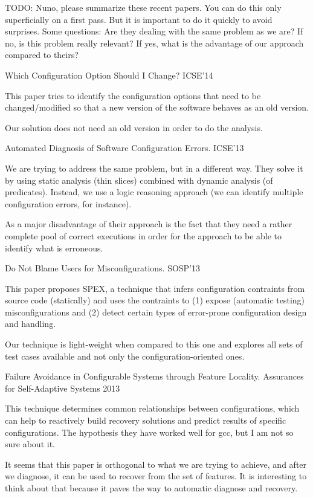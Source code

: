 TODO: Nuno, please summarize these recent papers.  You can do this
only superficially on a first pass.  But it is important to do it
quickly to avoid surprises.  Some questions: Are they dealing with the
same problem as we are?  If no, is this problem really relevant?  If
yes, what is the advantage of our approach compared to theirs?

Which Configuration Option Should I Change?  ICSE'14

This paper tries to identify the configuration options that need to be changed/modified
so that a new version of the software behaves as an old version.

Our solution does not need an old version in order to do the analysis.

Automated Diagnosis of Software Configuration Errors.  ICSE'13

We are trying to address the same problem, but in a different way. They solve it by using
static analysis (thin slices) combined with dynamic analysis (of predicates). Instead, we
use a logic reasoning approach (we can identify multiple configuration errors, for instance).

As a major disadvantage of their approach is the fact that they need a rather complete pool
of correct executions in order for the approach to be able to identify what is erroneous.


Do Not Blame Users for Misconfigurations.  SOSP'13

This paper proposes SPEX, a technique that infers configuration contraints from source
code (statically) and uses the contraints to (1) expose (automatic testing) misconfigurations
and (2) detect certain types of error-prone configuration design and handling.

Our technique is light-weight when compared to this one and explores all sets of test
cases available and not only the configuration-oriented ones.


Failure Avoidance in Configurable Systems through Feature Locality. Assurances for Self-Adaptive Systems 2013

This technique determines common relationships between configurations, which can help to reactively
build recovery solutions and predict results of specific configurations. The hypothesis they have
worked well for gcc, but I am not so sure about it. 

It seems that this paper is orthogonal to what we are trying to achieve, and after we diagnose, it
can be used to recover from the set of features. It is interesting to think about that because it
paves the way to automatic diagnose and recovery.
